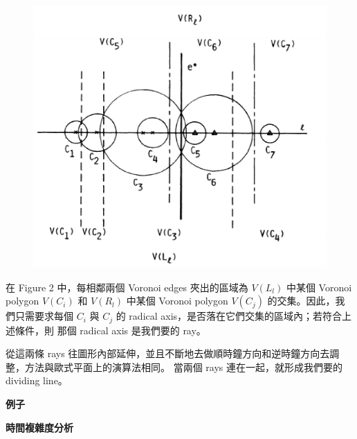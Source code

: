 \documentclass[12pt]{article}
\begin{document}
\begin{CJK}{UTF8}{bkai}
\begin{figure}
\includegraphics[scale=0.5]{figure5(iv).eps}
\caption{}
\label{}
\end{figure}

在 Figure 2 中，每相鄰兩個 Voronoi edges 夾出的區域為 $V(L_l)$ 中某個 Voronoi polygon $V(C_i)$ 和 $V(R_l)$ 中某個 Voronoi polygon
 $V(C_j)$ 的交集。因此，我們只需要求每個 $C_i$ 與 $C_j$ 的 radical axis，是否落在它們交集的區域內；若符合上述條件，則
那個 radical axis 是我們要的 ray。


從這兩條 rays 往圖形內部延伸，並且不斷地去做順時鐘方向和逆時鐘方向去調整，方法與歐式平面上的演算法相同。
當兩個 rays 連在一起，就形成我們要的 dividing line。\\



\centerline{\bf 例子}

\centerline{\bf 時間複雜度分析}

\end{CJK}
\end{document}
